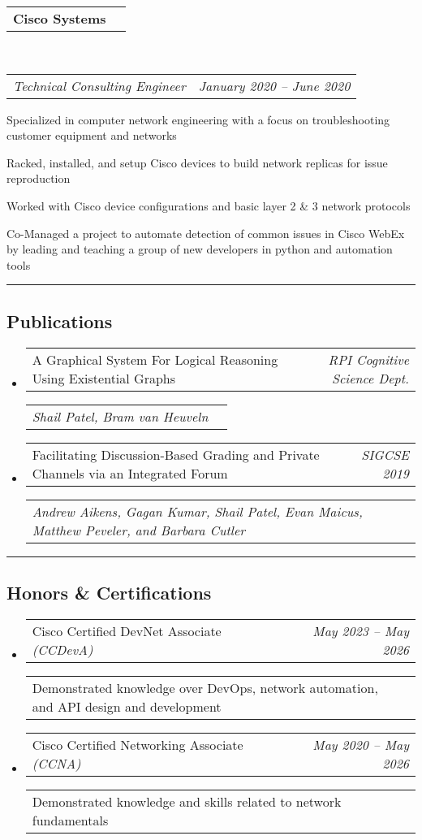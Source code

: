 \documentclass[10pt,letterpaper]{article}
\makeatletter
\newcommand{\headerrow}[2]
{\begin{tabular*}{\linewidth}{l@{\extracolsep{\fill}}r}
	#1 &
	#2 \\
\end{tabular*}}
\makeatother
\begin{document}
\begin{itemize}
	\headerrow
		{\textbf{Cisco Systems}}
		{}
	\\
	\headerrow
		{\emph{Technical Consulting Engineer}}
		{\emph{January 2020 -- June 2020}}

\end{itemize}

\hrule
\subsection*{Publications}
\begin{itemize}
	\item
		\headerrow
		{A Graphical System For Logical Reasoning Using Existential Graphs}
		{\emph{RPI Cognitive Science Dept.}}
		\headerrow
		{\emph{Shail Patel, Bram van Heuveln}}
		{}
	\item
		\headerrow
		{Facilitating Discussion-Based Grading and Private Channels via an Integrated Forum}
		{\emph {SIGCSE 2019}}
		\headerrow
		{\emph {Andrew Aikens, Gagan Kumar, Shail Patel, Evan Maicus, Matthew Peveler, and Barbara Cutler}}
		{}
\end{itemize}
\vspace{-0.1em}
\hrule
\vspace{-0.25em}
\subsection*{Honors \& Certifications}
\begin{itemize}
    \item 
        \headerrow
        {Cisco Certified DevNet Associate \emph{(CCDevA)}}
	    {\emph{May 2023 -- May 2026}}
	    \headerrow
	    {Demonstrated knowledge over DevOps, network automation, and API design and development}
	    {}
    \item 
        \headerrow
	    {Cisco Certified Networking Associate \emph{(CCNA)}}
	    {\emph{May 2020 -- May 2026}}
	    \headerrow
	    {Demonstrated knowledge and skills related to network fundamentals}
	    {}
\end{itemize}
\end{document}
